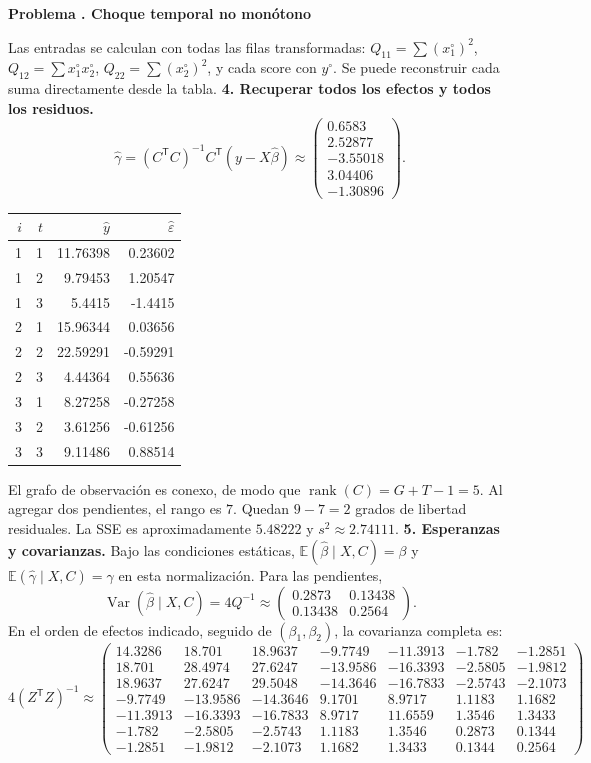 \documentclass[11pt,a4paper]{article}
\newcommand{\E}{\mathbb E}
\newcommand{\T}{^{\mathsf T}}
\DeclareMathOperator{\Var}{Var}
\DeclareMathOperator{\rank}{rank}
\theoremstyle{definition}
\newcounter{problema}
\newenvironment{resuelto}[1]{\refstepcounter{problema}\par\medskip\Needspace{6\baselineskip}\textbf{Problema \theproblema. #1}\par}{\par\medskip}
\newcommand{\eps}{\varepsilon}
\begin{document}
\begin{resuelto}{Choque temporal no monótono}
\[\]
Las entradas se calculan con todas las filas transformadas: $Q_{11}=\sum (x_1^\circ)^2$, $Q_{12}=\sum x_1^\circ x_2^\circ$, $Q_{22}=\sum (x_2^\circ)^2$, y cada score con $y^\circ$. Se puede reconstruir cada suma directamente desde la tabla.
\textbf{4. Recuperar todos los efectos y todos los residuos.}
\[
\widehat\gamma=(C\T C)^{-1}C\T(y-X\widehat\beta)\approx\begin{pmatrix}
0.6583\\2.52877\\-3.55018\\3.04406\\-1.30896
\end{pmatrix}.
\]

\begin{center}\small
\begin{tabular}{rrrr}
\toprule
$i$&$t$&$\widehat y$&$\widehat\eps$\\
\midrule
1&1&11.76398&0.23602\\
1&2&9.79453&1.20547\\
1&3&5.4415&-1.4415\\
2&1&15.96344&0.03656\\
2&2&22.59291&-0.59291\\
2&3&4.44364&0.55636\\
3&1&8.27258&-0.27258\\
3&2&3.61256&-0.61256\\
3&3&9.11486&0.88514\\
\bottomrule
\end{tabular}
\end{center}
El grafo de observación es conexo, de modo que $\rank(C)=G+T-1=5$. Al agregar dos pendientes, el rango es $7$. Quedan $9-7=2$ grados de libertad residuales. La SSE es aproximadamente $5.48222$ y $s^2\approx2.74111$.
\textbf{5. Esperanzas y covarianzas.} Bajo las condiciones estáticas, $\E(\widehat\beta\mid X,C)=\beta$ y $\E(\widehat\gamma\mid X,C)=\gamma$ en esta normalización. Para las pendientes,
\[
\Var(\widehat\beta\mid X,C)=4Q^{-1}\approx\begin{pmatrix}
0.2873&0.13438\\0.13438&0.2564
\end{pmatrix}.
\]
En el orden de efectos indicado, seguido de $(\beta_1,\beta_2)$, la covarianza completa es:
{\small
\[
4(Z\T Z)^{-1}\approx\begin{pmatrix}
14.3286&18.701&18.9637&-9.7749&-11.3913&-1.782&-1.2851\\18.701&28.4974&27.6247&-13.9586&-16.3393&-2.5805&-1.9812\\18.9637&27.6247&29.5048&-14.3646&-16.7833&-2.5743&-2.1073\\-9.7749&-13.9586&-14.3646&9.1701&8.9717&1.1183&1.1682\\-11.3913&-16.3393&-16.7833&8.9717&11.6559&1.3546&1.3433\\-1.782&-2.5805&-2.5743&1.1183&1.3546&0.2873&0.1344\\-1.2851&-1.9812&-2.1073&1.1682&1.3433&0.1344&0.2564

\end{pmatrix}\]}
\end{resuelto}
\end{document}
